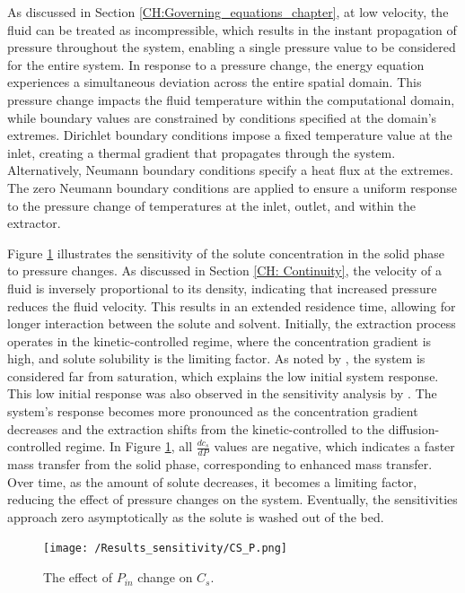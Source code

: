 \documentclass[a4paper,fleqn]{cas-dc}
\begin{document}
	As discussed in Section \ref{CH:Governing_equations_chapter}, at low velocity, the fluid can be treated as incompressible, which results in the instant propagation of pressure throughout the system, enabling a single pressure value to be considered for the entire system. In response to a pressure change, the energy equation experiences a simultaneous deviation across the entire spatial domain. This pressure change impacts the fluid temperature within the computational domain, while boundary values are constrained by conditions specified at the domain's extremes. Dirichlet boundary conditions impose a fixed temperature value at the inlet, creating a thermal gradient that propagates through the system. Alternatively,  Neumann boundary conditions specify a heat flux at the extremes. The zero Neumann boundary conditions are applied to ensure a uniform response to the pressure change of temperatures at the inlet, outlet, and within the extractor.
	
	Figure \ref{fig:Sensitivty_P_CS} illustrates the sensitivity of the solute concentration in the solid phase to pressure changes. As discussed in Section \ref{CH: Continuity}, the velocity of a fluid is inversely proportional to its density, indicating that increased pressure reduces the fluid velocity. This results in an extended residence time, allowing for longer interaction between the solute and solvent.	Initially, the extraction process operates in the kinetic-controlled regime, where the concentration gradient is high, and solute solubility is the limiting factor. As noted by \citet{Sliczniuk2024}, the system is considered far from saturation, which explains the low initial system response. This low initial response was also observed in the sensitivity analysis by \citet{Fiori_2007}. The system's response becomes more pronounced as the concentration gradient decreases and the extraction shifts from the kinetic-controlled to the diffusion-controlled regime. In Figure \ref{fig:Sensitivty_P_CS}, all $\frac{dc_s}{dP}$ values are negative, which indicates a faster mass transfer from the solid phase, corresponding to enhanced mass transfer.  Over time, as the amount of solute decreases, it becomes a limiting factor, reducing the effect of pressure changes on the system. Eventually, the sensitivities approach zero asymptotically as the solute is washed out of the bed.
	
	\begin{figure}[!ht]
		\centering
		\texttt{[image: /Results\_sensitivity/CS\_P.png]}
		\caption{The effect of $P_{in}$ change on $C_s$.}
		\label{fig:Sensitivty_P_CS}
	\end{figure}
	
\end{document}
